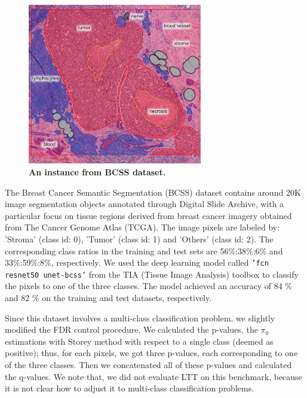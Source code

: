 \documentclass{article}
\begin{document}
\begin{figure}[h!]
	\centering
	\includegraphics[width=3in]{img/bcss_instance.jpeg}
	\caption{{\bf An instance from BCSS dataset.}}
	\label{fig:bcss_example}
\end{figure} 

The Breast Cancer Semantic Segmentation (BCSS) dataset \cite{Amgad2019StructuredCE} contains around 20K image segmentation objects annotated through Digital Slide Archive, with a particular focus on tissue regions derived from breast cancer imagery obtained from The Cancer Genome Atlas (TCGA). The image pixels are labeled by: 'Stroma' (class id: 0), 'Tumor' (class id: 1) and 'Others' (class id: 2). The corresponding class ratios in the training and test sets are 56\%:38\%:6\% and 33\%:59\%:8\%, respectively. We used the deep learning model called \texttt{'fcn resnet50 unet-bcss'} from the TIA (Tissue Image Analysis) toolbox \cite{Pocock2022} to classify the pixels to one of the three classes. The model achieved an accuracy of 84 \% and 82 \% on the training and test datasets, respectively. 

Since this dataset involves a multi-class classification problem, we slightly modified the FDR control procedure. We calculated the p-values, the $\pi_0$ estimations with Storey method with respect to a single class (deemed as positive); thus, for each pixels, we got three p-values, each corresponding to one of the three classes. Then we concatenated all of these p-values and calculated the q-values. We note that, we did not evaluate LTT on this benchmark, because it is not clear how to adjust it to multi-class classification problems.



\end{document}
